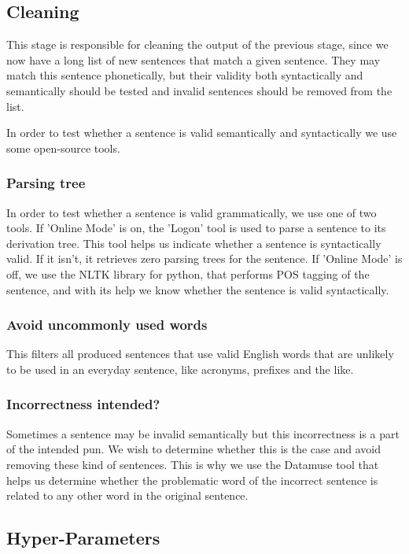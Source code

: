 \documentclass[11pt,a4paper]{article}
\begin{document}
\subsection{Cleaning}

This stage is responsible for cleaning the output of the previous stage, since we now have a long list of new sentences that match a given sentence. They may match this sentence phonetically, but their validity both syntactically and semantically should be tested and invalid sentences should be removed from the list. 

In order to test whether a sentence is valid semantically and syntactically we use some open-source tools. 

\subsubsection{Parsing tree}
In order to test whether a sentence is valid grammatically, we use one of two tools.
If 'Online Mode' is on, the 'Logon' tool  is used to parse a sentence to its derivation tree. This tool helps us indicate whether a sentence is syntactically valid. If it isn't, it retrieves zero parsing trees for the sentence. If 'Online Mode' is off, we use the NLTK library  for python, that performs POS tagging of the sentence, and with its help we know whether the sentence is valid syntactically.

\subsubsection{Avoid uncommonly used words}
This filters all produced sentences that use valid English words that are unlikely to be used in an everyday sentence, like acronyms, prefixes and the like.

\subsubsection{Incorrectness intended?}
Sometimes a sentence may be invalid semantically but this incorrectness is a part of the intended pun. We wish to determine whether this is the case and avoid removing these kind of sentences. This is why we use the Datamuse tool  that helps us determine whether the problematic word of the incorrect sentence is related to any other word in the original sentence. 

\subsection{Hyper-Parameters}
\end{document}
